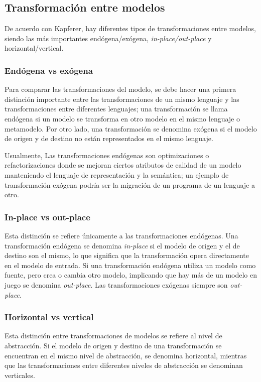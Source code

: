 \subsection{Transformación entre modelos}
De acuerdo con Kapferer\cite{kapferer_model_2019}, hay diferentes tipos de transformaciones entre modelos, siendo las más importantes endógena/exógena, \textit{in-place/out-place} y horizontal/vertical. 

\subsubsection*{Endógena vs exógena}
Para comparar las transformaciones del modelo, se debe hacer una primera distinción importante entre las transformaciones de un mismo lenguaje y las transformaciones entre diferentes lenguajes; una transformación se llama endógena si un modelo se transforma en otro modelo en el mismo lenguaje o metamodelo. Por otro lado, una transformación se denomina exógena si el modelo de origen y de destino no están representados en el mismo lenguaje.


Usualmente, Las transformaciones endógenas son optimizaciones o refactorizaciones donde se mejoran ciertos atributos de calidad de un modelo manteniendo el lenguaje de representación y la semántica; un ejemplo de transformación exógena podría ser la migración de un programa de un lenguaje a otro.

\subsubsection*{In-place vs out-place}

Esta distinción se refiere únicamente a las transformaciones endógenas. Una transformación endógena se denomina \textit{in-place} si el modelo de origen y el de destino son el mismo, lo que significa que la transformación opera directamente en el modelo de entrada. Si una transformación endógena utiliza un modelo como fuente, pero crea o cambia otro modelo, implicando que hay más de un modelo en juego se denomina \textit{out-place}. Las transformaciones exógenas siempre son \textit{out-place}.

\subsubsection*{Horizontal vs vertical}

Esta distinción entre transformaciones de modelos se refiere al nivel de abstracción. Si el modelo de origen y destino de una transformación se encuentran en el mismo nivel de abstracción, se denomina horizontal, mientras que las transformaciones entre diferentes niveles de abstracción se denominan verticales.

